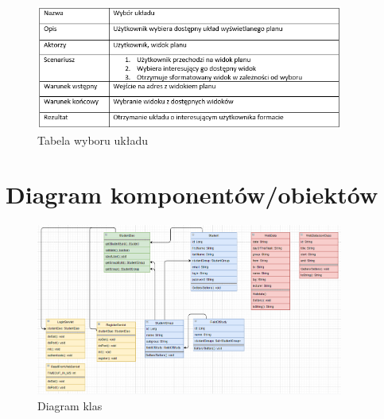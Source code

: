 \documentclass[a4paper,11pt]{uzreport}
\begin{document}
     \begin{figure}[ht!]
        \centering
        \includegraphics[width=0.9\textwidth]{pictures/wybor ukladu.PNG}
        \caption{Tabela wyboru układu}
        \label{fig9}
     \end{figure}

\clearpage
\section{Diagram komponentów/obiektów}

	\begin{figure}[ht!]
        	\centering
        	\includegraphics[width=0.9\textwidth]{pictures/Diagram_klas.png}
        	\caption{Diagram klas}
       		\label{diagram_klas}
     	\end{figure}
\end{document}
